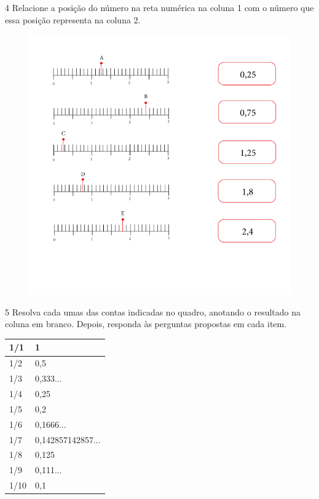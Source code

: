 \num{4} Relacione a posição do número na reta numérica na coluna 1 com o
número que essa posição representa na coluna 2.

\begin{figure}[htpb!]
\includegraphics[width=\textwidth]{../ilustracoes/MAT5/SAEB_5ANO_MAT_figura88.png}
\end{figure}


\num{5} Resolva cada umas das contas indicadas no quadro, anotando o
resultado na coluna em branco. Depois, responda às perguntas propostas em cada item.

\begin{longtable}[]{@{}ll@{}}
\toprule
1/1 & 1\tabularnewline
\midrule
\endhead
1/2 & 0,5\tabularnewline
1/3 & 0,333...\tabularnewline
1/4 & 0,25\tabularnewline
1/5 & 0,2\tabularnewline
1/6 & 0,1666...\tabularnewline
1/7 & 0,142857142857...\tabularnewline
1/8 & 0,125\tabularnewline
1/9 & 0,111...\tabularnewline
1/10 & 0,1\tabularnewline
\bottomrule
\end{longtable}

